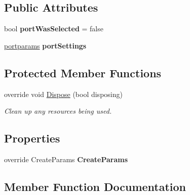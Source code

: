\subsection*{Public Attributes}
\begin{DoxyCompactItemize}
\item 
\mbox{\label{class_b_n_a30_1_1_form_com_port_a47a27fde4d6bc6f618250777f562b840}} 
bool {\bfseries port\+Was\+Selected} = false
\item 
\mbox{\label{class_b_n_a30_1_1_form_com_port_aa7cae567ecae762d08e52bc842b9bef1}} 
\mbox{\hyperlink{struct_b_n_a30_1_1_form_com_port_1_1portparams}{portparams}} {\bfseries port\+Settings}
\end{DoxyCompactItemize}
\subsection*{Protected Member Functions}
\begin{DoxyCompactItemize}
\item 
override void \mbox{\hyperlink{class_b_n_a30_1_1_form_com_port_a10f6b78062e701ded1cb1814f9a53fde}{Dispose}} (bool disposing)
\begin{DoxyCompactList}\small\item\em Clean up any resources being used. \end{DoxyCompactList}\end{DoxyCompactItemize}
\subsection*{Properties}
\begin{DoxyCompactItemize}
\item 
\mbox{\label{class_b_n_a30_1_1_form_com_port_ab10f5c1b86fb91bac7ccdbb7ca698735}} 
override Create\+Params {\bfseries Create\+Params}
\end{DoxyCompactItemize}


\subsection{Member Function Documentation}
\mbox{\label{class_b_n_a30_1_1_form_com_port_a10f6b78062e701ded1cb1814f9a53fde}} 
